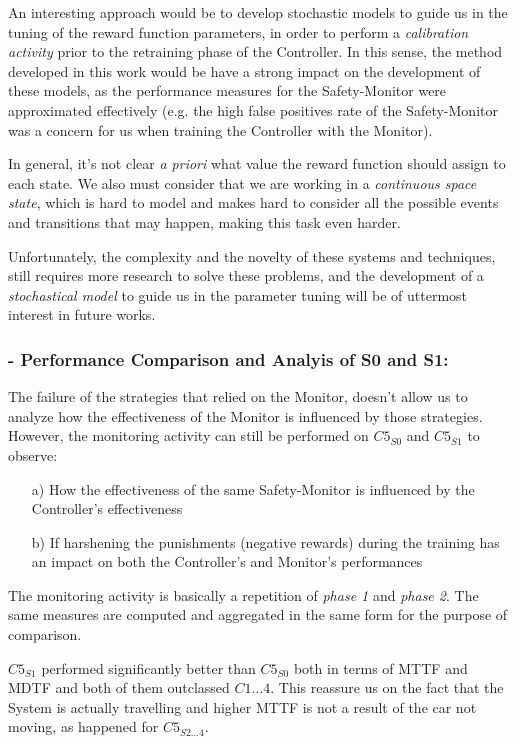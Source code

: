 An interesting approach would be to develop stochastic models to guide us in the tuning of the reward function parameters, in order to perform a \textsl{calibration activity} prior to the retraining phase of the Controller. In this sense, the method developed in this work would be have a strong impact on the development of these models, as the performance measures for the Safety-Monitor were approximated effectively (e.g. the high false positives rate of the Safety-Monitor was a concern for us when training the Controller with the Monitor).\newline

In general, it's not clear \textsl{a priori} what value the reward function should assign to each state. We also must consider that we are working in a \textsl{continuous space state}, which is hard to model and makes hard to consider all the possible events and transitions that may happen, making this task even harder.

Unfortunately, the complexity and the novelty of these systems and techniques, still requires more research to solve these problems, and the development of a \textsl{stochastical model} to guide us in the parameter tuning will be of uttermost interest in future works.\newpage


\subsubsection{- Performance Comparison and Analyis of S0 and S1:}

The failure of the strategies that relied on the Monitor, doesn't allow us to analyze how the effectiveness of the Monitor is influenced by those strategies. However, the monitoring activity can still be performed on $C5_{S0}$ and $C5_{S1}$ to observe:

\begin{itemize}
	\item[a)] How the effectiveness of the same Safety-Monitor is influenced by the Controller's effectiveness
	\item[b)] If harshening the punishments (negative rewards) during the training has an impact on both the Controller's and Monitor's performances
\end{itemize}

The monitoring activity is basically a repetition of \textsl{phase 1} and \textsl{phase 2}. The same measures are computed and aggregated in the same form for the purpose of comparison.

$C5_{S1}$ performed significantly better than $C5_{S0}$ both in terms of MTTF and MDTF and both of them outclassed $C1\dots 4$. This reassure us on the fact that the System is actually travelling and higher MTTF is not a result of the car not moving, as happened for $C5_{S2\dots 4}$.

